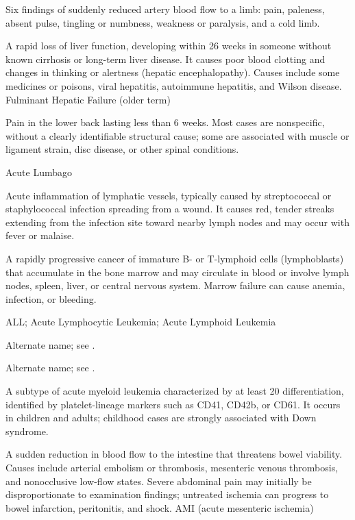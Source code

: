  Six findings of suddenly reduced artery blood flow to a limb: pain, paleness, absent pulse, tingling or numbness, weakness or paralysis, and a cold limb.

 A rapid loss of liver function, developing within 26 weeks
in someone without known cirrhosis or long-term liver disease. It causes poor blood
clotting and changes in thinking or alertness (hepatic encephalopathy). Causes include
some medicines or poisons, viral hepatitis, autoimmune hepatitis, and Wilson disease.
\synonyms
Fulminant Hepatic Failure (older term)

 Pain in the lower back lasting less than 6 weeks.
Most cases are nonspecific, without a clearly identifiable structural cause;
some are associated with muscle or ligament strain, disc disease, or other
spinal conditions.

\synonyms
Acute Lumbago

 Acute inflammation of lymphatic vessels, typically caused by streptococcal or staphylococcal infection spreading from a wound. It causes red, tender streaks extending from the infection site toward nearby lymph nodes and may occur with fever or malaise.

 A rapidly progressive cancer of immature B- or T-lymphoid cells (lymphoblasts) that accumulate in the bone marrow and may circulate in blood or involve lymph nodes, spleen, liver, or central nervous system. Marrow failure can cause anemia, infection, or bleeding.

\synonyms
ALL; Acute Lymphocytic Leukemia; Acute Lymphoid Leukemia

 Alternate name; see .

 Alternate name; see .

 A subtype of acute myeloid leukemia characterized by at least 20%
differentiation, identified by platelet-lineage markers such as CD41, CD42b, or CD61. It occurs
in children and adults; childhood cases are strongly associated with Down syndrome.

 A sudden reduction in blood flow to the intestine that threatens bowel viability. Causes include arterial embolism or thrombosis, mesenteric venous thrombosis, and nonocclusive low-flow states. Severe abdominal pain may initially be disproportionate to examination findings; untreated ischemia can progress to bowel infarction, peritonitis, and shock.
\synonyms
AMI (acute mesenteric ischemia)

